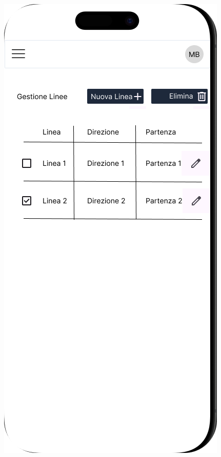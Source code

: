 \begin{figure}[H]
  \centering
  \begin{minipage}[b]{0.25\textwidth}
    \centering
    \includegraphics[width=\textwidth]{images/mockup/Gestione Linee Mobile.png}

\end{minipage}
\end{figure}
